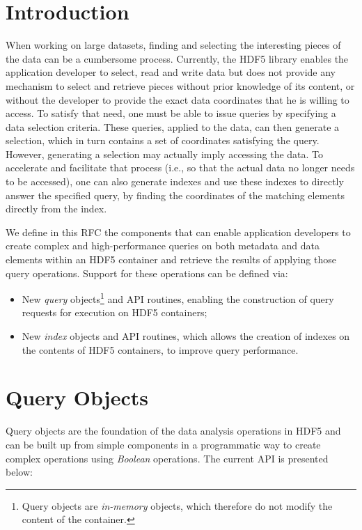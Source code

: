 \section{Introduction}
When working on large datasets, finding and selecting the interesting pieces of
the data can be a cumbersome process. Currently, the HDF5 library enables the 
application developer to select, read and write data but does not provide any 
mechanism to select and retrieve pieces without prior knowledge of its
content, or without the developer to provide the exact data coordinates that
he is willing to access. To satisfy that need, one must be able
to issue queries by specifying a data selection criteria. These queries,
applied to the data, can then generate a selection, which in turn contains a
set of coordinates
satisfying the query. However, generating a selection may actually imply accessing the
data. To accelerate and facilitate that
process (i.e., so that the actual data no longer needs to be accessed), one can
also generate indexes and use these indexes
to directly answer the specified query, by finding the coordinates of the matching
elements directly from the index.

We define in this RFC the components that can enable application developers to
create complex and high-performance queries on both metadata and data elements
within an HDF5 container and retrieve the results of applying those query
operations. Support for these operations can be defined via:
\begin{itemize}
\item New \textit{query} objects\footnote{Query objects are
\textit{in-memory} objects, which therefore do not modify the content of the
container.\label{fn:object}} and API routines, enabling the construction of
query requests for execution on HDF5 containers;
\item New \textit{index} objects and API routines, which allows the creation of
indexes on the contents of HDF5 containers, to improve query performance.
\end{itemize}

\section{Query Objects}
Query objects are the foundation of the data analysis operations in HDF5 and
can be built up from simple components in a programmatic way to create complex
operations using \textit{Boolean} operations. The current API is presented
below:

